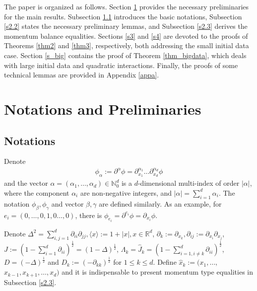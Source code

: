 \documentclass[10pt,twoside,a4paper]{article}
\numberwithin{equation}{section}\allowdisplaybreaks
\def\leq{\leqslant}
\begin{document}
 The paper is organized as follows.  Section \ref{s2} provides the necessary preliminaries for the main results. Subsection \ref{s2.1} introduces the basic notations, Subsection \ref{s2.2} states the necessary preliminary lemmas, and Subsection \ref{s2.3} derives the momentum balance equalities. Sections \ref{s3} and \ref{s4} are devoted to the proofs of Theorems \ref{thm2} and \ref{thm3}, respectively, both addressing the small initial data case. Section \ref{s_big} contains the proof of Theorem \ref{thm_bigdata}, which deals with large initial data and quadratic interactions. Finally, the proofs of some technical lemmas are provided in Appendix \ref{appa}.






	
\section{Notations and Preliminaries}  \label{s2}
\subsection{Notations} \label{s2.1}

Denote
\begin{align*}
	\phi_\alpha:=\partial^\alpha \phi=\partial_{x_1}^{\alpha_1}\ldots\partial_{x_d}^{\alpha_d} \phi
\end{align*}
and the vector $ \alpha=(\alpha_1,\ldots,\alpha_d) \in \mathbb{N}^d_0$ is a $ d $-dimensional multi-index of order $ |\alpha| $, where the component $ \alpha_i $ are non-negative integers, and $ |\alpha|=\sum_{i=1}^d \alpha_i $. 
The  notation $ \phi_\beta, \phi_\gamma $ and vector $ \beta, \gamma$    are defined similarly.  As an example,  for   $ e_i=( 0,\ldots,0,1,0\ldots,0) $,  there is $ \phi_{e_i}=\partial^{e_i} \phi=\partial_{x_i} \phi $.

Denote $\Delta^2=\sum_{i,j=1}^d \partial_{ii}\partial_{jj},  \langle x \rangle:= 1+|x|, x\in \mathbb{R}^d  $, $ \partial_k:=\partial_{x_k}, \partial_{ij}:=\partial_{x_i}\partial_{x_j} $,  $ J:= (1-\sum_{i=1}^d \partial_{ii}  )^{\frac12}=\left(1-\Delta \right)^{\frac12} $, $ \Lambda_k=\widehat{J}_k=  (1-\sum_{i=1,i\neq k}^d \partial_{ii} )^{\frac12} $, $ D=(-\Delta)^{\frac 12} $ and  $ D_k:=(-\partial_{kk})^{\frac 12} $ for $ 1\leq k\leq d. $  Define $ \hat{x}_k:= (x_1,\dots,$  $x_{k-1},x_{k+1},\dots,x_d ) $ and it is indispensable to present momentum type equalities in Subsection \ref{s2.3}.
\end{document}
